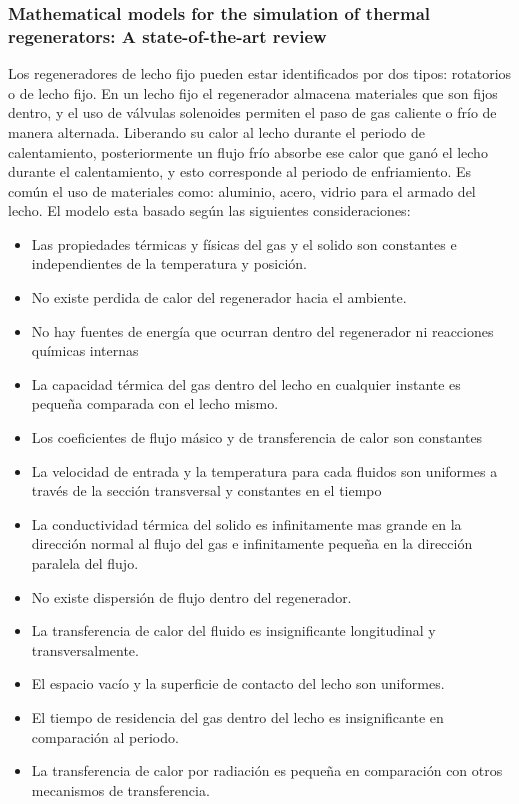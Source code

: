 \documentclass[12pt,letterpaper,final]{article}%
\begin{document}
\subsubsection*{Mathematical models for the simulation of thermal regenerators:
	A state-of-the-art review}
Los regeneradores de lecho fijo pueden estar identificados por dos tipos: rotatorios o de lecho fijo. En un lecho fijo el regenerador almacena materiales que son fijos dentro, y el uso de válvulas solenoides permiten el paso de gas caliente o frío de manera alternada. Liberando su calor al lecho durante el periodo de calentamiento, posteriormente un flujo frío absorbe ese calor que ganó el lecho durante el calentamiento, y esto corresponde al periodo de enfriamiento. Es común el uso de materiales como: aluminio, acero, vidrio para el armado del lecho\cite{SADRAMELI2016}.
\newline
El modelo esta basado según las siguientes consideraciones:
\begin{itemize}
	\item Las propiedades térmicas y físicas del gas y el solido son constantes e independientes de la temperatura y posición.
	\item No existe perdida de calor del regenerador hacia el ambiente.
	\item No hay fuentes de energía que ocurran dentro del regenerador ni reacciones químicas internas
	\item La capacidad térmica del gas dentro del lecho en cualquier instante es pequeña comparada con el lecho mismo.
	\item Los coeficientes de flujo másico y de transferencia de calor son constantes
	\item La velocidad de entrada y la temperatura para cada fluidos son uniformes a través de la sección transversal y constantes en el tiempo
	\item La conductividad térmica del solido es infinitamente mas grande en la dirección normal al flujo del gas e infinitamente pequeña en la dirección paralela del flujo.
	\item No existe dispersión de flujo dentro del regenerador.
	\item La transferencia de calor del fluido es insignificante longitudinal y transversalmente.
	\item El espacio vacío y la superficie de contacto del lecho son uniformes.
	\item El tiempo de residencia del gas dentro del lecho es insignificante en comparación al periodo.
	\item La transferencia de calor por radiación es pequeña en comparación con otros mecanismos de transferencia.
\end{itemize}
\end{document}
